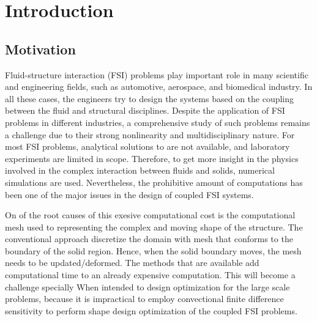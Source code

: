 \chapter{Introduction}
\section{Motivation}
Fluid-structure interaction (FSI) problems play important role in many scientific and engineering fields, such as automotive, aerospace, and biomedical industry. In all these cases, the engineers try to design the systems based on the coupling between the fluid and structural disciplines. Despite the application of FSI problems in different industries, a comprehensive study of such problems remains a challenge due to their strong nonlinearity and multidisciplinary nature. For most FSI problems, analytical solutions to are not available, and laboratory experiments are limited in scope. Therefore, to get more insight in the physics involved in the complex interaction between fluids and solids, numerical simulations are used. Nevertheless, the prohibitive amount of computations has been one of the major issues in the design of coupled FSI systems. 

On of the root causes of this exesive computational cost is the computational mesh used to representing the complex and moving shape of the structure. The conventional approach discretize the domain with mesh that conforms to the boundary of the solid region. Hence, when the solid boundary moves, the mesh needs to be updated/deformed. The methods that are available add computational time to an already expensive computation. This will become a challenge specially When intended to design optimization for the large scale problems, because it is impractical to employ convectional finite difference sensitivity to perform shape design optimization of the coupled FSI problems.